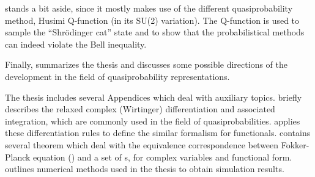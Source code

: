  stands a bit aside, since it mostly makes use of the different quasiprobability method, Husimi Q-function (in its SU(2) variation).
The Q-function is used to sample the ``Shr\"odinger cat'' state and to show that the probabilistical methods can indeed violate the Bell inequality.

Finally,  summarizes the thesis and discusses some possible directions of the development in the field of quasiprobability representations.

The thesis includes several Appendices which deal with auxiliary topics.
 briefly describes the relaxed complex (Wirtinger) differentiation and associated integration, which are commonly used in the field of quasiprobabilities.
 applies these differentiation rules to define the similar formalism for functionals.
 contains several theorem which deal with the equivalence correspondence between Fokker-Planck equation () and a set of s, for complex variables and functional form.
 outlines numerical methods used in the thesis to obtain simulation results.
